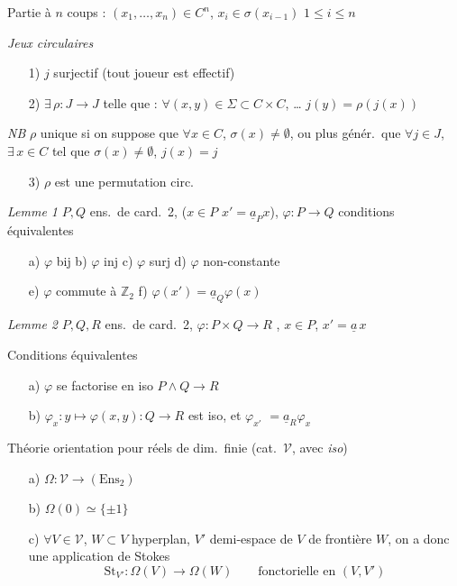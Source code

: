 \documentclass[11pt,a4paper]{article}
\begin{document}
Partie à $n$ coups : \struck{\ill{}} $(x_1, \ldots, x_n) \in C^n$, \quad
$x_i \in \sigma(x_{i-1})$ \quad $1 \leq i \leq n$

\emph{Jeux circulaires}
\begin{itemize}
  \item[1)] $j$ surjectif (tout joueur est effectif)
  \item[2)] $\exists\, \rho : J \to J$ telle que :
  $\forall (x, y) \in \Sigma \subset C \times C$, … $j(y) = \rho(j(x))$
\end{itemize}
\emph{NB} $\rho$ unique si on suppose que $\forall x \in C$,
$\sigma(x) \neq \emptyset$, ou plus génér.\ que $\forall j \in J$,
$\exists\, x \in C$ tel que $\sigma(x) \neq \emptyset$, $j(x) = j$
\begin{itemize}
  \item[3)] $\rho$ est une permutation circ.
\end{itemize}


\emph{Lemme 1} $P, Q$ ens.\ de card.\ 2, ($x \in P$ \struck{\ill{}}
$x' = \underline{a}_P x$), $\varphi : P \to Q$ conditions équivalentes
\begin{itemize}
  \item[a)] $\varphi$ bij \quad b) $\varphi$ inj \quad c) $\varphi$ surj
  \quad d) $\varphi$ non-constante
  \item[e)] $\varphi$ commute à $\mathbb{Z}_2$ \quad f)
  $\varphi(x') = \underline{a}_Q \varphi(x)$
\end{itemize}

\emph{Lemme 2} $P, Q, R$ ens.\ de card.\ 2, $\varphi : P \times Q \to R$
, $x \in P$, $x' = \underline{a}\, x$

Conditions équivalentes
\begin{itemize}
  \item[a)] $\varphi$ se factorise en iso $P \wedge Q \to R$
  \item[b)] $\varphi_x : y \mapsto \varphi(x, y) : Q \to R$ est iso, et
  $\varphi_{x'}$  $= \underline{a}_R \varphi_x$
\end{itemize}

Théorie orientation pour \struck{\ill{}}  réels de dim.\
finie (cat.\ $\mathcal{V}$, avec \emph{iso})
\begin{itemize}
  \item[a)] \struck{\ill{}} $\Omega : \mathcal{V} \to (\mathrm{Ens}_2)$
  \item[b)] $\Omega(0) \simeq \{\pm 1\}$
  \item[c)] $\forall V \in \mathcal{V}$, \struck{\ill{}} $W \subset V$
  hyperplan, $V'$ demi-espace de $V$ de frontière $W$, on a donc une
  application de Stokes
  \[
  \mathrm{St}_{V'} : \Omega(V) \to \Omega(W) \qquad \text{fonctorielle en } (V, V')
  \]
\end{itemize}
\end{document}
